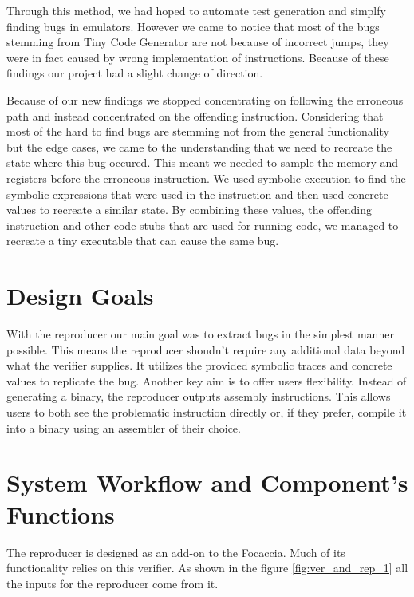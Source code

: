 Through this method, we had hoped to automate test generation and simplfy finding bugs in emulators.
However we came to notice that most of the bugs stemming from Tiny Code Generator are not because of incorrect jumps, they were in fact caused by wrong implementation of instructions.
Because of these findings our project had a slight change of direction.

Because of our new findings we stopped concentrating on following the erroneous path and instead concentrated on the offending instruction.
Considering that most of the hard to find bugs are stemming not from the general functionality but the edge cases, we came to the understanding that we need to recreate the state where this bug occured.
This meant we needed to sample the memory and registers before the erroneous instruction.
We used symbolic execution to find the symbolic expressions that were used in the instruction and then used concrete values to recreate a similar state.
By combining these values, the offending instruction and other code stubs that are used for running code, we managed to recreate a tiny executable that can cause the same bug.

\section{Design Goals}
With the reproducer our main goal was to extract bugs in the simplest manner possible.
This means the reproducer shoudn't require any additional data beyond what the verifier supplies.
It utilizes the provided symbolic traces and concrete values to replicate the bug.
Another key aim is to offer users flexibility.
Instead of generating a binary, the reproducer outputs assembly instructions.
This allows users to both see the problematic instruction directly or, if they prefer, compile it into a binary using an assembler of their choice.

\section{System Workflow and Component's Functions}
The reproducer is designed as an add-on to the Focaccia.
Much of its functionality relies on this verifier.
As shown in the figure \ref{fig:ver_and_rep_1} all the inputs for the reproducer come from it.

